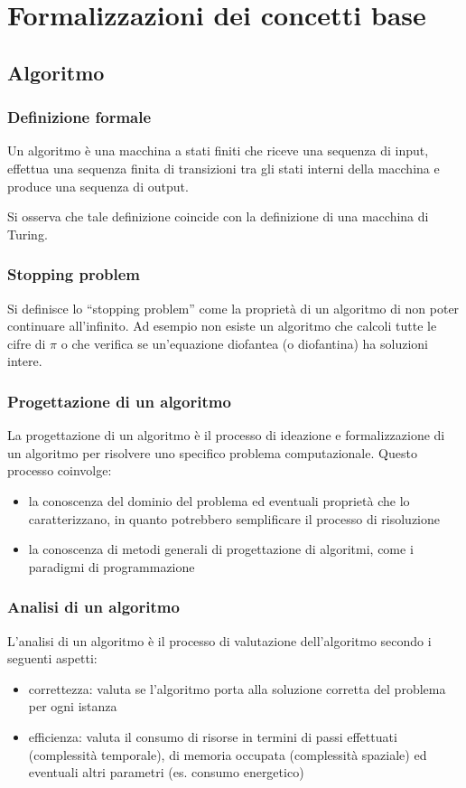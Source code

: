 \section{Formalizzazioni dei concetti base}
\subsection{Algoritmo}
\subsubsection*{Definizione formale}
Un algoritmo è una macchina a stati finiti che riceve una sequenza di input, effettua una sequenza finita di transizioni tra
gli stati interni della macchina e produce una sequenza di output.

Si osserva che tale definizione coincide con la definizione di una macchina di Turing.

\subsubsection*{Stopping problem}
Si definisce lo ``stopping problem'' come la proprietà di un algoritmo di non poter continuare all'infinito. Ad esempio non
esiste un algoritmo che calcoli tutte le cifre di $\pi$ o che verifica se un'equazione diofantea (o diofantina) ha soluzioni
intere.

\subsubsection*{Progettazione di un algoritmo}
La progettazione di un algoritmo è il processo di ideazione e formalizzazione di un algoritmo per risolvere uno specifico
problema computazionale. Questo processo coinvolge:
\begin{itemize}
	\item la conoscenza del dominio del problema ed eventuali proprietà che lo caratterizzano, in quanto potrebbero
	semplificare il processo di risoluzione
	\item la conoscenza di metodi generali di progettazione di algoritmi, come i paradigmi di programmazione
\end{itemize}

\subsubsection*{Analisi di un algoritmo}
L'analisi di un algoritmo è il processo di valutazione dell'algoritmo secondo i seguenti aspetti:
\begin{itemize}
	\item correttezza: valuta se l'algoritmo porta alla soluzione corretta del problema per ogni istanza
	\item efficienza: valuta il consumo di risorse in termini di passi effettuati (complessità temporale), di memoria
	occupata (complessità spaziale) ed eventuali altri parametri (es. consumo energetico)
\end{itemize}

